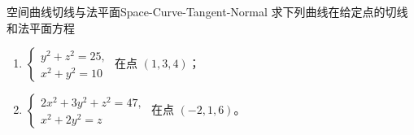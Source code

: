 \begin{problem}{空间曲线切线与法平面}{Space-Curve-Tangent-Normal}
    求下列曲线在给定点的切线和法平面方程
    \begin{enumerate}
        \item $\begin{cases} y^2 + z^2 = 25, \\ x^2 + y^2 = 10 \end{cases}$ 在点 $(1, 3, 4)$；
        \item $\begin{cases} 2x^2 + 3y^2 + z^2 = 47, \\ x^2 + 2y^2 = z \end{cases}$ 在点 $(-2, 1, 6)$。
    \end{enumerate}
\end{problem}

